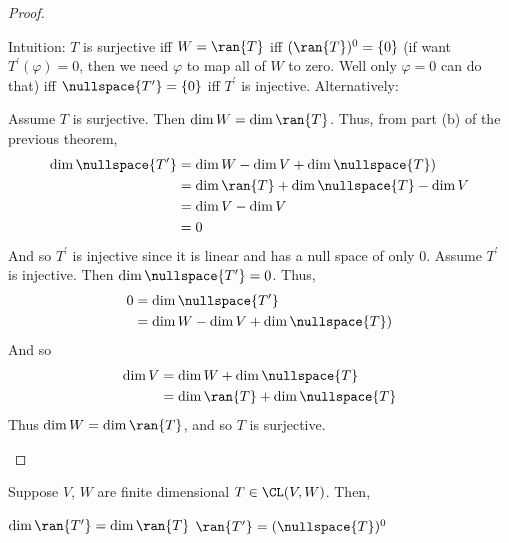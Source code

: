 \documentclass{article}
\begin{document}
  \begin{proof}
    \begin{enumerate}[label=\alph*)]
      \ii 
        Intuition: $T$ is surjective iff $W = \ran{T}$ iff $(\ran{T})^0 = \{0\}$ (if want $T^{\prime}(\varphi) = 0$, then we need $\varphi$ to map all of $W$ to zero. Well only $\varphi = 0$
        can do that) iff $\nullspace{T^{\prime}} = \{0\}$ iff $T^{\prime}$ is injective. Alternatively:

        Assume $T$ is surjective. Then $\dim W = \dim\ran{T}$. Thus, from part (b) of the previous theorem,
        \begin{align*}
          \dim\nullspace{T^{\prime}} & = \dim W - \dim V + \dim\nullspace{T}) \\
          & = \dim\ran{T} + \dim\nullspace{T} - \dim V\\
          & = \dim V - \dim V \\
          & = 0
        \end{align*}
        And so $T^{\prime}$ is injective since it is linear and has a null space of only $0$.
      \ii 
        Assume $T^{\prime}$ is injective. Then $\dim\nullspace{T^{\prime}} = 0$. Thus,
        \begin{align*}
          0 & = \dim\nullspace{T^{\prime}} \\
          & = \dim W - \dim V + \dim\nullspace{T}) \\
        \end{align*}
        And so 
        \begin{align*}
          \dim V & = \dim W + \dim\nullspace{T} \\
          & = \dim\ran{T} + \dim\nullspace{T}
        \end{align*}
        Thus $\dim W = \dim\ran{T}$, and so $T$ is surjective.
    \end{enumerate}
  \end{proof}
  \begin{prop}
    Suppose $V$, $W$ are finite dimensional $T \in \CL(V, W)$. Then,
    \begin{enumerate}[label=\alph*)]
        \ii 
          $\dim\ran{T^{\prime}} = \dim\ran{T}$
        \ii 
          $\ran{T^{\prime}} = (\nullspace{T})^0$
    \end{enumerate}
  \end{prop}
\end{document}
